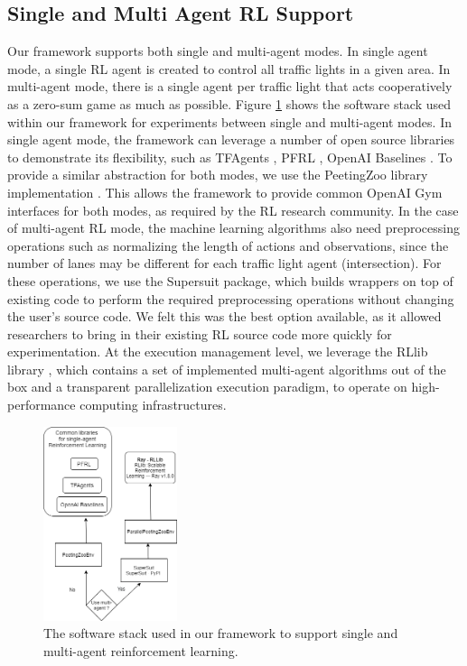 \documentclass[a4paper,twoside]{article}
\begin{document}
\subsection {Single and Multi Agent RL Support}
Our framework supports both single and multi-agent modes. In single agent mode, a single RL agent is created to control all traffic lights in a given area. In multi-agent mode, there is a single agent per traffic light that acts cooperatively as a zero-sum game as much as possible. Figure \ref{fig:softwarestack} shows the software stack used within our framework for experiments between single and multi-agent modes. In single agent mode, the framework can leverage a number of open source libraries to demonstrate its flexibility, such as TFAgents \cite{TFAgents}, PFRL \cite{PFRL}, OpenAI Baselines \cite{baselines}. To provide a similar abstraction for both modes, we use the PeetingZoo library implementation \cite{terry2020pettingzoo}. This allows the framework to provide common OpenAI Gym interfaces \cite{gym} for both modes, as required by the RL research community. In the case of multi-agent RL mode, the machine learning algorithms also need preprocessing operations such as normalizing the length of actions and observations, since the number of lanes may be different for each traffic light agent (intersection). For these operations, we use the Supersuit \cite{SuperSuit}package, which builds wrappers on top of existing code to perform the required preprocessing operations without changing the user's source code. We felt this was the best option available, as it allowed researchers to bring in their existing RL source code more quickly for experimentation. At the execution management level, we leverage the RLlib library \cite{liang2018rllib}, which contains a set of implemented multi-agent algorithms out of the box and a transparent parallelization execution paradigm, to operate on high-performance computing infrastructures.

\begin{figure}[!h]
	\includegraphics[width=0.35\textwidth]{softwarestack.png}
	\centering
	\caption{The software stack used in our framework to support single and multi-agent reinforcement learning.}
	\label{fig:softwarestack}
\end{figure}
\end{document}
